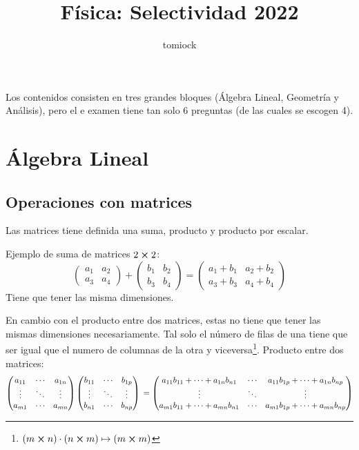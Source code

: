 \documentclass[arial,a4paper,print]{article}
\title{Física: Selectividad 2022}
\author{tomiock}
\begin{document}
\maketitle

Los contenidos consisten en tres grandes bloques (Álgebra Lineal, Geometría y Análisis), pero el e examen tiene tan solo 6 preguntas (de las cuales se escogen 4). 

\section{Álgebra Lineal}
\subsection{Operaciones con matrices}

Las matrices tiene definida una suma, producto y producto por escalar.

Ejemplo de suma de matrices $2\cross2$:
\begin{equation*}
	\begin{pmatrix}
		a_{1} & a_{2} \\
		a_{3} & a_{4}
	\end{pmatrix} +
	\begin{pmatrix}
		b_{1} & b_{2} \\
		b_{3} & b_{4}
	\end{pmatrix} = 
	\begin{pmatrix}
		a_{1} + b_{1} & a_{2} + b_{2} \\
		a_{3} + b_{3} & a_{4} + b_{4}
	\end{pmatrix}
\end{equation*}
Tiene que tener las misma dimensiones. 

En cambio con el producto entre dos matrices, estas no tiene que tener las mismas dimensiones necesariamente. Tal solo el número de filas de una tiene que ser igual que el numero de columnas de la otra y viceversa\footnote{$(m\cross n ) \cdot (n\cross m) \mapsto (m\cross m)$}. Producto entre dos matrices: 
\begin{equation*}
\begin{pmatrix}
	a_{1 1} & \cdots & a_{1 n} \\
	\vdots & \ddots & \vdots \\
	a_{m 1} & \cdots & a_{m n}
\end{pmatrix} 
\begin{pmatrix}
	b_{1 1} & \cdots & b_{1 p} \\
	\vdots & \ddots & \vdots \\
	b_{n 1} & \cdots & b_{n p}
\end{pmatrix} \\
=
\begin{pmatrix}
	a_{11}b_{11}+ \cdots +a_{1n}b_{n1} & \cdots & a_{11}b_{1p}+ \cdots +a_{1n}b_{np} \\
	\vdots & \ddots & \vdots \\
	a_{m1}b_{11}+ \cdots +a_{mn}b_{n1} & \cdots & a_{m1}b_{1p}+ \cdots +a_{mn}b_{np}
\end{pmatrix}
\end{equation*}
\end{document}
